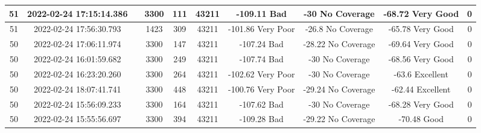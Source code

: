 \begin{longtable*}{|c|c|c|c|c|c|c|c|c|c|}
51&2022-02-24 17:15:14.386&&3300&111&43211& -109.11   Bad         & -30       No Coverage & -68.72    Very Good   & 0\\\hline
{}51&2022-02-24 17:56:30.793&&1423&309&43211& -101.86   Very Poor   & -26.8     No Coverage & -65.78    Very Good   & 0\\\hline
{}50&2022-02-24 17:06:11.974&&3300&147&43211& -107.24   Bad         & -28.22    No Coverage & -69.64    Very Good   & 0\\\hline
{}50&2022-02-24 16:01:59.682&&3300&249&43211& -107.74   Bad         & -30       No Coverage & -68.56    Very Good   & 0\\\hline
{}50&2022-02-24 16:23:20.260&&3300&264&43211& -102.62   Very Poor   & -30       No Coverage & -63.6     Excellent   & 0\\\hline
{}50&2022-02-24 18:07:41.741&&3300&448&43211& -100.76   Very Poor   & -29.24    No Coverage & -62.44    Excellent   & 0\\\hline
{}50&2022-02-24 15:56:09.233&&3300&164&43211& -107.62   Bad         & -30       No Coverage & -68.28    Very Good   & 0\\\hline
{}50&2022-02-24 15:55:56.697&&3300&394&43211& -109.28   Bad         & -29.22    No Coverage & -70.48    Good        & 0\\\hline

\end{longtable*}
